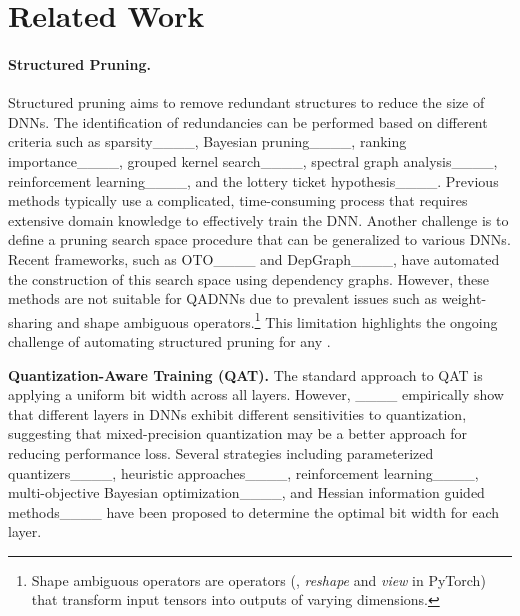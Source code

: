\section{Related Work}
\paragraph{Structured Pruning.} Structured pruning aims to remove redundant structures to reduce the size of DNNs. The identification of redundancies can be performed based on different criteria such as  sparsity____, Bayesian pruning____, ranking importance____, grouped kernel search____, spectral graph analysis____, reinforcement learning____, and the lottery ticket hypothesis____. %
Previous methods typically use a complicated, time-consuming process that requires extensive domain knowledge to effectively train the DNN. %
Another challenge is to define a pruning search space procedure that can be generalized to various DNNs. %
Recent frameworks, such as OTO____ and DepGraph____, have automated the construction of this search space using dependency graphs. However, these methods are not suitable for QADNNs due to prevalent issues such as weight-sharing and shape ambiguous operators.\footnote{Shape ambiguous operators are  operators (\eg, \textit{reshape} and \textit{view} in PyTorch) that transform input tensors into outputs of varying dimensions.} This limitation highlights the ongoing challenge of automating structured pruning for any \qadnn{}.



\smallskip
\noindent \textbf{Quantization-Aware Training (QAT).} The standard approach to QAT is applying a  uniform bit width across all layers. However, ____ empirically show that different layers in DNNs exhibit different sensitivities to quantization, suggesting that mixed-precision quantization may be a better approach for reducing performance loss. Several strategies including parameterized quantizers____, heuristic approaches____, reinforcement learning____, multi-objective Bayesian optimization____, and Hessian information guided methods____ have been proposed to determine the optimal bit width for each layer.



